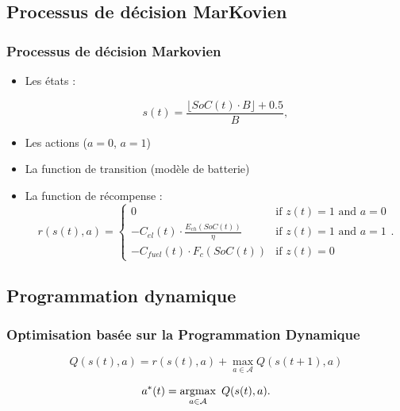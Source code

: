 \documentclass[french]{beamer}
\begin{document}
{\subsection{Processus de décision MarKovien}

\begin{frame}
\frametitle{Processus de décision Markovien}
\begin{center}
\begin{itemize}
\item Les états :
 
\begin{equation}
s(t) = \frac{\lfloor \mathit{SoC}(t) \cdot B \rfloor + 0.5}{B}, 
\label{eq:state}
\end{equation}
\item Les actions ($a=0$, $a=1$)
\item La function de transition (modèle de batterie)
\item La function de récompense :
\begin{equation}
r(s(t),a) =
\begin{cases}
0 & \text{if $z(t)=1$ and $a=0$}\\
-C_{el}(t) \cdot \frac{E_{ch}(SoC(t))}{\eta} & \text{if $z(t)=1$ and $a=1$}\\
- C_{fuel}(t) \cdot F_{c}(SoC(t)) & \text{if $z(t)=0$}   
\end{cases}.\label{eq:reward}
\end{equation}
\end{itemize}
\end{center}
\end{frame}


\subsection{Programmation dynamique}


\begin{frame}
\begin{center}
\frametitle{Optimisation basée sur la Programmation Dynamique}

\begin{equation}
Q(s(t),a) =
r(s(t),a) + \max\limits_{a\in\mathcal{A}} Q(s(t+1),a) 
\end{equation}

\begin{equation}
a^*(t) = \argmax\limits_{a\in\mathcal{A}}~Q(s(t),a).\label{eq:adecisions}
\end{equation}
\end{center}
\end{frame}


}
\end{document}
